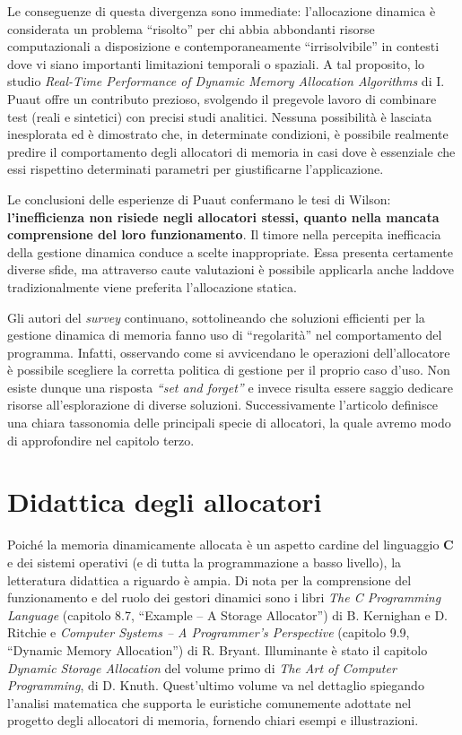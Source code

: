Le conseguenze di questa divergenza sono immediate: l’allocazione dinamica è considerata un problema ``risolto'' per chi abbia abbondanti risorse computazionali a disposizione e contemporaneamente ``irrisolvibile'' in contesti dove vi siano importanti limitazioni temporali o spaziali. A tal proposito, lo studio \textit{Real-Time Performance of Dynamic Memory Allocation Algorithms} di I. Puaut\cite{puaut2002} offre un contributo prezioso, svolgendo il pregevole lavoro di combinare test (reali e sintetici) con precisi studi analitici. Nessuna possibilità è lasciata inesplorata ed è dimostrato che, in determinate condizioni, è possibile realmente predire il comportamento degli allocatori di memoria in casi dove è essenziale che essi rispettino determinati parametri per giustificarne l’applicazione.

Le conclusioni delle esperienze di Puaut confermano le tesi di Wilson: \textbf{l’inefficienza non risiede negli allocatori stessi, quanto nella mancata comprensione del loro funzionamento}. Il timore nella percepita inefficacia della gestione dinamica conduce a scelte inappropriate. Essa presenta certamente diverse sfide, ma attraverso caute valutazioni è possibile applicarla anche laddove tradizionalmente viene preferita l’allocazione statica.

Gli autori del \textit{survey} continuano, sottolineando che soluzioni efficienti per la gestione dinamica di memoria fanno uso di ``regolarità'' nel comportamento del programma. Infatti, osservando come si avvicendano le operazioni dell'allocatore è possibile scegliere la corretta politica di gestione per il proprio caso d’uso. Non esiste dunque una risposta \textit{``set and forget''} e invece risulta essere saggio dedicare risorse all’esplorazione di diverse soluzioni. Successivamente l’articolo definisce una chiara tassonomia delle principali specie di allocatori, la quale avremo modo di approfondire nel capitolo terzo.

\section{Didattica degli allocatori}

Poiché la memoria dinamicamente allocata è un aspetto cardine del linguaggio \textbf{C} e dei sistemi operativi (e di tutta la programmazione a basso livello), la letteratura didattica a riguardo è ampia. Di nota per la comprensione del funzionamento e del ruolo dei gestori dinamici sono i libri \textit{The C Programming Language} (capitolo 8.7, ``Example – A Storage Allocator'') di B. Kernighan e D. Ritchie\cite{kernighan1988} e \textit{Computer Systems – A Programmer’s Perspective} (capitolo 9.9, ``Dynamic Memory Allocation'') di R. Bryant\cite{bryant2015}. Illuminante è stato il capitolo \textit{Dynamic Storage Allocation} del volume primo di \textit{The Art of Computer Programming}, di D. Knuth\cite{knuth1997}. Quest’ultimo volume va nel dettaglio spiegando l’analisi matematica che supporta le euristiche comunemente adottate nel progetto degli allocatori di memoria, fornendo chiari esempi e illustrazioni.

